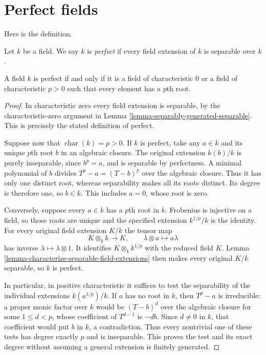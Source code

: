 \section{Perfect fields}
\label{section-perfect-fields}

\noindent
Here is the definition.

\begin{definition}
\label{definition-perfect}
Let $k$ be a field. We say $k$ is {\it perfect}
if every field extension of $k$ is separable over $k$.
\end{definition}

\begin{lemma}
\label{lemma-perfect}
A field $k$ is perfect if and only if it is a field of characteristic $0$
or a field of characteristic $p > 0$ such that every element has a $p$th
root.
\end{lemma}

\begin{proof}
In characteristic zero every field extension is
separable, by the characteristic-zero argument in
Lemma \ref{lemma-separably-generated-separable}.
This is precisely the stated definition of perfect.

Suppose now that $\operatorname{char}(k)=p>0$.
If $k$ is perfect, take any $a\in k$ and its unique
$p$th root $b$ in an algebraic closure. The original
extension $k(b)/k$ is purely inseparable, since
$b^p=a$, and is separable by perfectness. A minimal
polynomial of $b$ divides $T^p-a=(T-b)^p$ over the
algebraic closure. Thus it has only one distinct
root, whereas separability makes all its roots
distinct. Its degree is therefore one, so $b\in k$.
This includes $a=0$, whose root is zero.

Conversely, suppose every $a\in k$ has a $p$th root
in $k$. Frobenius is injective on a field, so those
roots are unique and the specified extension
$k^{1/p}/k$ is the identity. For every original
field extension $K/k$ the tensor map
$$
K\otimes_k k\longrightarrow K,\qquad
\lambda\otimes a\longmapsto a\lambda
$$
has inverse $\lambda\mapsto\lambda\otimes1$.
It identifies $K\otimes_k k^{1/p}$ with the reduced
field $K$. Lemma
\ref{lemma-characterize-separable-field-extensions}
then makes every original $K/k$ separable, so $k$
is perfect.

In particular, in positive characteristic it
suffices to test the separability of the individual
extensions $k(a^{1/p})/k$. If $a$ has no root in $k$,
then $T^p-a$ is irreducible: a proper monic factor
over $k$ would be $(T-b)^d$ over the algebraic
closure for some $1\leq d<p$, whose coefficient
of $T^{d-1}$ is $-db$. Since $d\neq0$ in $k$,
that coefficient would put $b$ in $k$, a contradiction.
Thus every nontrivial one of these tests has degree
exactly $p$ and is inseparable. This proves the
test and its exact degree without assuming a
general extension is finitely generated.
\end{proof}

